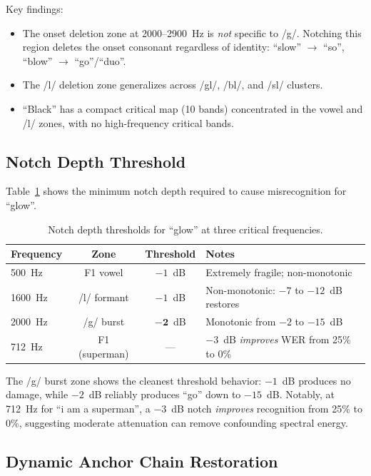 \documentclass[11pt,a4paper]{article}
\begin{document}
Key findings:
\begin{itemize}[leftmargin=*,itemsep=2pt]
    \item The onset deletion zone at 2000--2900~Hz is \emph{not} specific to
        /g/. Notching this region deletes the onset consonant regardless of
        identity: ``slow'' $\rightarrow$ ``so'', ``blow'' $\rightarrow$
        ``go''/``duo''.
    \item The /l/ deletion zone generalizes across /gl/, /bl/, and /sl/ clusters.
    \item ``Black'' has a compact critical map (10 bands) concentrated in the
        vowel and /l/ zones, with no high-frequency critical bands.
\end{itemize}

\subsection{Notch Depth Threshold}

Table~\ref{tab:depth} shows the minimum notch depth required to cause
misrecognition for ``glow''.

\begin{table}[H]
\centering
\caption{Notch depth thresholds for ``glow'' at three critical frequencies.}
\label{tab:depth}
\begin{tabular}{@{}lccp{5cm}@{}}
\toprule
\textbf{Frequency} & \textbf{Zone} & \textbf{Threshold} & \textbf{Notes} \\
\midrule
500~Hz   & F1 vowel      & $-1$~dB & Extremely fragile; non-monotonic \\
1600~Hz  & /l/ formant   & $-1$~dB & Non-monotonic: $-7$ to $-12$~dB restores \\
2000~Hz  & /g/ burst     & $\mathbf{-2}$~dB & Monotonic from $-2$ to $-15$~dB \\
712~Hz   & F1 (superman) & ---     & $-3$~dB \emph{improves} WER from 25\% to 0\% \\
\bottomrule
\end{tabular}
\end{table}

The /g/ burst zone shows the cleanest threshold behavior: $-1$~dB produces no
damage, while $-2$~dB reliably produces ``go'' down to $-15$~dB. Notably, at
712~Hz for ``i am a superman'', a $-3$~dB notch \emph{improves} recognition
from 25\% to 0\%, suggesting moderate attenuation can remove confounding
spectral energy.

\subsection{Dynamic Anchor Chain Restoration}
\end{document}
